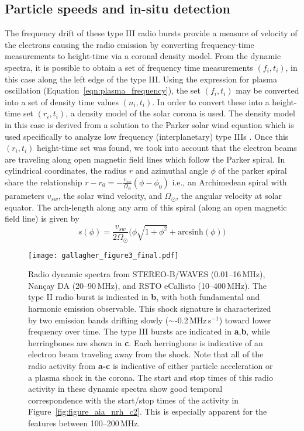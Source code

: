 \subsection{Particle speeds and in-situ detection}
The frequency drift of these type III radio bursts provide a measure of velocity of the electrons causing the radio emission by converting frequency-time measurements to height-time via a coronal density model. From the dynamic spectra, it is possible to obtain a set of frequency time measurements $(f_i,t_i)$, in this case along the left edge of the type III. Using the expression for plasma oscillation (Equation~\ref{eqn:plasma_frequency}), the set $(f_i,t_i)$ may be converted into a set of density time values $(n_i,t_i)$. In order to convert these into a height-time set $(r_i,t_i)$, a density model of the solar corona is used. The density model in this case is derived from a solution to the Parker solar wind equation which is used specifically to analyze low frequency (interplanetary) type IIIs \citep{Mann1999}. Once this $(r_i,t_i)$ height-time set was found, we took into account that the electron beams are traveling along open magnetic field lines which follow the Parker spiral. In cylindrical coordinates, the radius $r$ and azimuthal angle $\phi$ of the parker spiral share the relationship $r-r_0= -\frac{v_{sw}}{\Omega_{\odot}}( \phi - \phi_0)$ i.e., an Archimedean spiral with parameters $v_{sw}$, the solar wind velocity, and $\Omega_{\odot}$, the angular velocity at solar equator. The arch-length along any arm of this spiral (along an open magnetic field line) is given by
\begin{equation}
s(\phi) = \frac{v_{sw}} {2\Omega_{\odot}}\big(\phi\sqrt{1+\phi^2} + \mathrm{arcsinh}(\phi)  \big)
\end{equation}

\begin{sidewaysfigure}[!t]
    \centering
\texttt{[image: gallagher\_figure3\_final.pdf]}
\caption[Radio dynamic spectra of 22-September-2011 event]{Radio dynamic spectra from STEREO-B/WAVES (0.01--16\,MHz), Nan\c{c}ay DA (20--90\,MHz), and RSTO eCallisto (10--400\,MHz). The type II radio burst is indicated in {\bf b}, with both fundamental and harmonic emission observable. This shock signature is characterized by two emission bands drifting slowly ($\sim$-0.2\,MHz\,s$^{-1}$) toward lower frequency over time. The type III bursts are indicated in {\bf a},{\bf b}, while herringbones are shown in {\bf c}. Each herringbone is indicative of an electron beam traveling away from the shock. Note that all of the radio activity from {\bf a-c} is indicative of either particle acceleration or a plasma shock in the corona. The start and stop times of this radio activity in these dynamic spectra show good temporal correspondence with the start/stop times of the activity in Figure~\ref{fig:figure_aia_nrh_c2}. This is especially apparent for the features between 100--200\,MHz.}
\label{fig:dyn_spec}
\end{sidewaysfigure}
\clearpage



